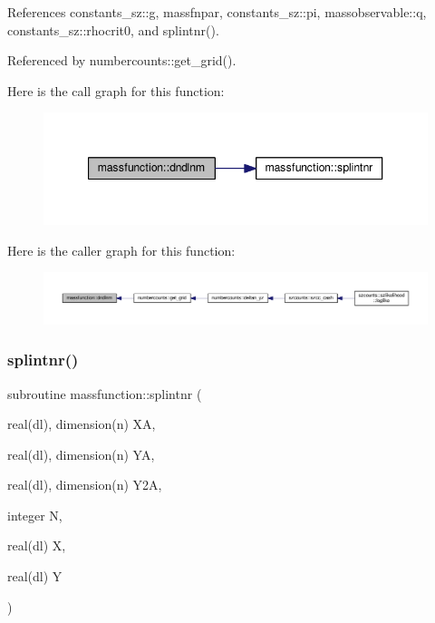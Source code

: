 References constants\+\_\+sz\+::g, massfnpar, constants\+\_\+sz\+::pi, massobservable\+::q, constants\+\_\+sz\+::rhocrit0, and splintnr().



Referenced by numbercounts\+::get\+\_\+grid().

Here is the call graph for this function\+:
\nopagebreak
\begin{figure}[H]
\begin{center}
\leavevmode
\includegraphics[width=344pt]{namespacemassfunction_a7388d3e1cd459ef602a588f13111b6f4_cgraph}
\end{center}
\end{figure}
Here is the caller graph for this function\+:
\nopagebreak
\begin{figure}[H]
\begin{center}
\leavevmode
\includegraphics[width=350pt]{namespacemassfunction_a7388d3e1cd459ef602a588f13111b6f4_icgraph}
\end{center}
\end{figure}
\mbox{\label{namespacemassfunction_a64c53fdad2880885e6d900d266bd160e}} 
\subsubsection{\texorpdfstring{splintnr()}{splintnr()}}
{\footnotesize\ttfamily subroutine massfunction\+::splintnr (\begin{DoxyParamCaption}\item[{real(dl), dimension(n)}]{XA,  }\item[{real(dl), dimension(n)}]{YA,  }\item[{real(dl), dimension(n)}]{Y2A,  }\item[{integer}]{N,  }\item[{real(dl)}]{X,  }\item[{real(dl)}]{Y }\end{DoxyParamCaption})}



